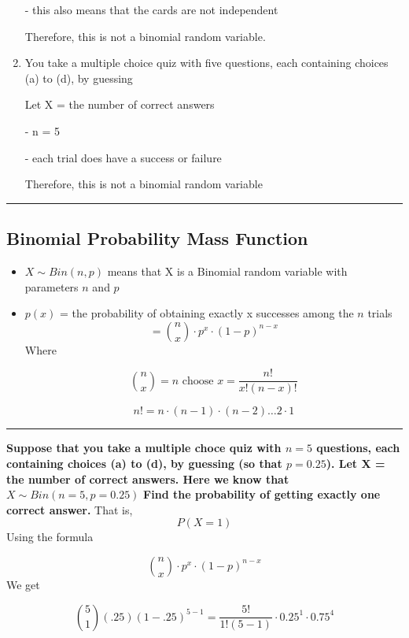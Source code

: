 \documentclass{report}
\begin{document}
\begin{enumerate}
      \subitem  - this also means that the cards are not independent
      \vspace{3mm}

      \subitem Therefore, this is not a binomial random variable.

    \item  You take a multiple choice quiz with five questions, each containing choices (a) to (d), by guessing

      Let X = the number of correct answers
      \vspace{2mm}

      \subitem - n = 5 
      \vspace{2mm}

      \subitem - each trial does have a success or failure
      \vspace{3mm}
  
      \subitem Therefore, this is not a binomial random variable
  \end{enumerate}
  \bigbreak \noindent
  \hrule
  \bigbreak \noindent
  \subsection*{Binomial Probability Mass Function} 
  \begin{itemize}
  \item $X\sim Bin(n,p)$ means that X is a Binomial random variable with parameters $n$ and $p$
    \item $p(x)$ = the probability of obtaining exactly x successes among the $n$ trials
      $$ = {n \choose x} \cdot p^x \cdot (1-p)^{n-x}$$
      Where

      $$ {n \choose x} = n \text{ choose } x = \dfrac{n!}{x!(n-x)!}$$

      $$ n! = n \cdot (n-1) \cdot (n-2) \ldots 2 \cdot 1$$
  \end{itemize}
  \bigbreak \noindent
  \hrule
  \bigbreak \noindent
  \q
  \bigbreak \noindent
  \textbf{Suppose that you take a multiple choce quiz with $n = 5$ questions, each containing choices (a) to (d), by guessing (so that $p = 0.25$). Let X = the number of correct answers. Here we know that $X \sim Bin(n=5,p=0.25)$}
  \bigbreak \noindent
  \textbf{Find the probability of getting exactly one correct answer. }
  \bigbreak \noindent
That is, 
$$P(X = 1 ) $$
Using the formula

$${n \choose x}\cdot p^x \cdot (1-p)^{n-x}$$
We get

$${5 \choose 1}(.25)(1-.25)^{5-1} = \frac{5!}{1!(5-1)} \cdot 0.25^1 \cdot 0.75^4$$
\end{document}
